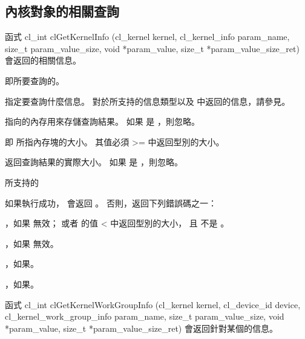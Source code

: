 \subsection{內核對象的相關查詢}

函式
\startclc
cl_int clGetKernelInfo (cl_kernel kernel,
			cl_kernel_info param_name,
			size_t param_value_size,
			void *param_value,
			size_t *param_value_size_ret)
\stopclc
會返回的相關信息。

 即所要查詢的。

 指定要查詢什麼信息。
對於所支持的信息類型以及  中返回的信息，請參見。

 指向的內存用來存儲查詢結果。
如果  是 ，則忽略。

 即  所指內存塊的大小。
其值必須 >= 中返回型別的大小。

 返回查詢結果的實際大小。
如果  是 ，則忽略。

\startbuffer[tblclGetKernelInfo]
 所支持的 
\stopbuffer
{}
{}

如果執行成功，  會返回 。
否則，返回下列錯誤碼之一：
\startigBase
\item {}，如果  無效；
或者  的值 < 中返回型別的大小，
且  不是 。

\item {}，如果  無效。

\item {}，如果\scdevfailres。

\item {}，如果\schostfailres。
\stopigBase

函式
\startclc
cl_int clGetKernelWorkGroupInfo (cl_kernel kernel,
			cl_device_id device,
			cl_kernel_work_group_info param_name,
			size_t param_value_size,
			void *param_value,
			size_t *param_value_size_ret)
\stopclc
會返回針對某個的信息。

